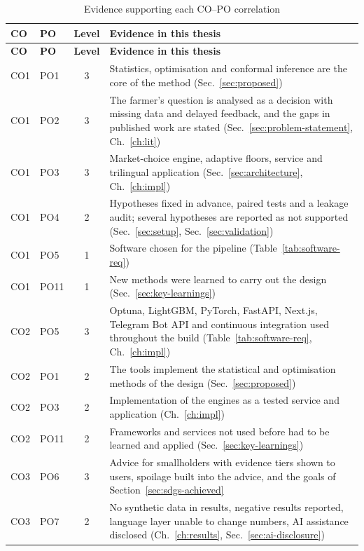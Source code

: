 {\small
\begin{longtable}{|l|l|c|p{8.2cm}|}
\caption{Evidence supporting each CO--PO correlation}\label{tab:attain}\\
\hline
\textbf{CO} & \textbf{PO} & \textbf{Level} & \textbf{Evidence in this thesis} \\ \hline
\endfirsthead
\hline
\textbf{CO} & \textbf{PO} & \textbf{Level} & \textbf{Evidence in this thesis} \\ \hline
\endhead
CO1 & PO1 & 3 & Statistics, optimisation and conformal inference are the core of the method (Sec.~\ref{sec:proposed}) \\ \hline
CO1 & PO2 & 3 & The farmer's question is analysed as a decision with missing data and delayed feedback, and the gaps in published work are stated (Sec.~\ref{sec:problem-statement}, Ch.~\ref{ch:lit}) \\ \hline
CO1 & PO3 & 3 & Market-choice engine, adaptive floors, service and trilingual application (Sec.~\ref{sec:architecture}, Ch.~\ref{ch:impl}) \\ \hline
CO1 & PO4 & 2 & Hypotheses fixed in advance, paired tests and a leakage audit; several hypotheses are reported as not supported (Sec.~\ref{sec:setup}, Sec.~\ref{sec:validation}) \\ \hline
CO1 & PO5 & 1 & Software chosen for the pipeline (Table~\ref{tab:software-req}) \\ \hline
CO1 & PO11 & 1 & New methods were learned to carry out the design (Sec.~\ref{sec:key-learnings}) \\ \hline
CO2 & PO5 & 3 & Optuna, LightGBM, PyTorch, FastAPI, Next.js, Telegram Bot API and continuous integration used throughout the build (Table~\ref{tab:software-req}, Ch.~\ref{ch:impl}) \\ \hline
CO2 & PO1 & 2 & The tools implement the statistical and optimisation methods of the design (Sec.~\ref{sec:proposed}) \\ \hline
CO2 & PO3 & 2 & Implementation of the engines as a tested service and application (Ch.~\ref{ch:impl}) \\ \hline
CO2 & PO11 & 2 & Frameworks and services not used before had to be learned and applied (Sec.~\ref{sec:key-learnings}) \\ \hline
CO3 & PO6 & 3 & Advice for smallholders with evidence tiers shown to users, spoilage built into the advice, and the goals of Section~\ref{sec:sdgs-achieved} \\ \hline
CO3 & PO7 & 2 & No synthetic data in results, negative results reported, language layer unable to change numbers, AI assistance disclosed (Ch.~\ref{ch:results}, Sec.~\ref{sec:ai-disclosure}) \\ \hline

\end{longtable}}
